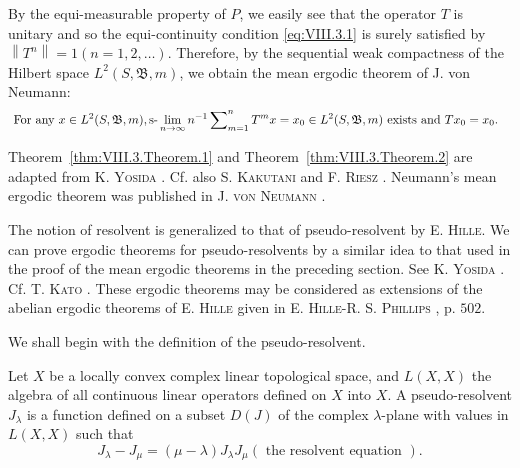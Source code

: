 By the equi-measurable property of $P$, we easily see that the operator $T$ is unitary and so the equi-continuity condition \eqref{eq:VIII.3.1} is surely satisfied by $\left\|T^{n}\right\|=1(n=1,2,\ldots)$. Therefore, by the sequential weak compactness of the Hilbert space $L^{2}(S,\mathfrak{B},m)$, we obtain the mean ergodic theorem of J. von Neumann: 
\begin{equation}\label{eq:VIII.3.10}
\begin{aligned}
&\text{ For any } x \in L ^{2} (S, \mathfrak {B}, m), \text{s-}\lim _{n \to \infty} n ^{-1} \sum\nolimits_{m=1} ^{n} T ^{m} x = x _{0} \in L ^{2} (S, \mathfrak {B}, m) \text{ exists and } T x _{0} = x _{0}.
\end{aligned}
\end{equation}

\begin{remarku} Theorem~\ref{thm:VIII.3.Theorem.1} and Theorem~\ref{thm:VIII.3.Theorem.2} are adapted from K. \textsc{Yosida} \cite{yosida346}. Cf. also S. \textsc{Kakutani} \cite{kakutani125} and F. \textsc{Riesz} \cite{rickart275}. Neumann's mean ergodic theorem was published in J. \textsc{von} \textsc{Neumann} \cite{neumann230}. 
\end{remarku}


\label{sec:VIII.4}

The notion of resolvent is generalized to that of pseudo-resolvent by E. \textsc{Hille}. We can prove ergodic theorems for pseudo-resolvents by a similar idea to that used in the proof of the mean ergodic theorems in the preceding section. See K. \textsc{Yosida} \cite{yosida347}. Cf. T. \textsc{Kato} \cite{kato134}. These ergodic theorems may be considered as extensions of the abelian ergodic theorems of E. \textsc{Hille} given in E. \textsc{Hille}-R. S. \textsc{Phillips} \cite{hille97}, p. $502$. 

We shall begin with the definition of the pseudo-resolvent. 

\begin{definitionu} Let $X$ be a locally convex complex linear topological space, and $L(X, X)$ the algebra of all continuous linear operators defined on $X$ into $X$. A pseudo-resolvent $J_{\lambda}$ is a function defined on a subset $D(J)$ of the complex $\lambda$-plane with values in $L(X, X)$ such that 
\begin{equation}\label{eq:VIII.4.1}
J _{\lambda} - J _{\mu} = (\mu - \lambda) J _{\lambda} J _{\mu} (\text{ the resolvent equation }).
\end{equation}
\end{definitionu}

